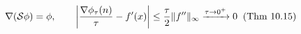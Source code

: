 \documentclass[preview]{standalone}
\begin{document}
\begin{align*}
\special{dvisvgm:raw <g id='unique000'>}\nabla(\mathcal{S}\phi) = \phi, \qquad \left|\frac{\nabla\phi_\tau(n)}{\tau} - f'(x)\right| \le \frac{\tau}{2}\|f''\|_\infty \xrightarrow{\tau\to 0^+} 0\;\;(\text{Thm 10.15})\special{dvisvgm:raw </g>}
\end{align*}
\end{document}
